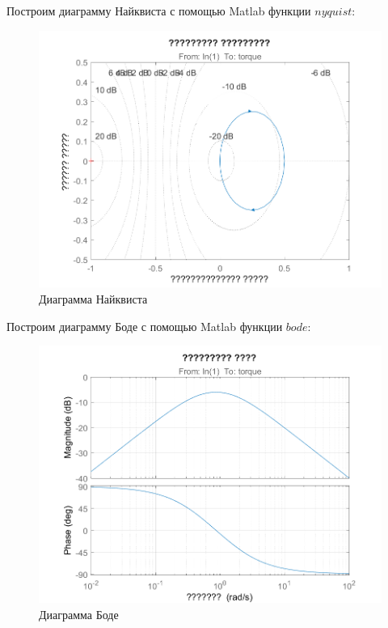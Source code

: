 \documentclass[14pt,a4paper,report]{report}
\begin{document}
\clearpage

Построим диаграмму Найквиста с помощью Matlab функции $nyquist$:

\begin{figure}[h!]
	\centering
	\includegraphics[scale = 0.90]{images/nyquist.png}
	\caption{Диаграмма Найквиста}
	\label{image:3}
\end{figure}

Построим диаграмму Боде с помощью Matlab функции $bode$:

\begin{figure}[h!]
	\centering
	\includegraphics[scale = 0.70]{images/bode.png}
	\caption{Диаграмма Боде}
	\label{image:4}
\end{figure}
\end{document}
